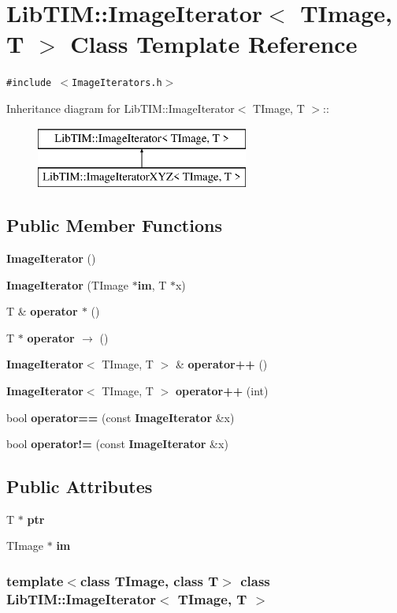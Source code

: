 \section{Lib\-TIM::Image\-Iterator$<$ TImage, T $>$ Class Template Reference}
\label{classLibTIM_1_1ImageIterator}
{\tt \#include $<$Image\-Iterators.h$>$}

Inheritance diagram for Lib\-TIM::Image\-Iterator$<$ TImage, T $>$::\begin{figure}[H]
\begin{center}
\leavevmode
\includegraphics[height=2cm]{classLibTIM_1_1ImageIterator}
\end{center}
\end{figure}
\subsection*{Public Member Functions}
\begin{CompactItemize}
\item 
{\bf Image\-Iterator} ()
\item 
{\bf Image\-Iterator} (TImage $\ast${\bf im}, T $\ast$x)
\item 
T \& {\bf operator $\ast$} ()
\item 
T $\ast$ {\bf operator $\rightarrow$ } ()
\item 
{\bf Image\-Iterator}$<$ TImage, T $>$ \& {\bf operator++} ()
\item 
{\bf Image\-Iterator}$<$ TImage, T $>$ {\bf operator++} (int)
\item 
bool {\bf operator==} (const {\bf Image\-Iterator} \&x)
\item 
bool {\bf operator!=} (const {\bf Image\-Iterator} \&x)
\end{CompactItemize}
\subsection*{Public Attributes}
\begin{CompactItemize}
\item 
T $\ast$ {\bf ptr}
\item 
TImage $\ast$ {\bf im}
\end{CompactItemize}
\subsubsection*{template$<$class TImage, class T$>$ class Lib\-TIM::Image\-Iterator$<$ TImage, T $>$}



